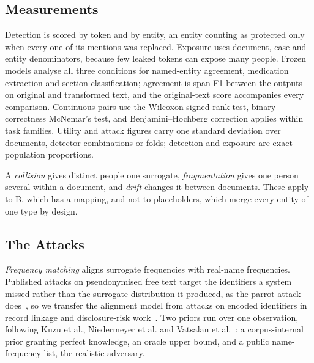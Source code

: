 \subsection{Measurements}\label{sec:measurements}

Detection is scored by token and by entity, an entity counting as protected only when every one of
its mentions was replaced. Exposure uses document, case and entity denominators, because few leaked
tokens can expose many people. Frozen models analyse all three conditions for named-entity agreement, medication extraction
and section classification; agreement is span F1 between the outputs on original and transformed
text, and the original-text score accompanies every comparison. Continuous pairs use the Wilcoxon
signed-rank test, binary correctness McNemar's test, and Benjamini--Hochberg correction applies
within task families. Utility and attack figures carry one standard deviation over documents,
detector combinations or folds; detection and exposure are exact population proportions.

A \emph{collision} gives distinct people one surrogate, \emph{fragmentation} gives one person
several within a document, and \emph{drift} changes it between documents. These apply to B, which
has a mapping, and not to placeholders, which merge every entity of one type by design.

\subsection{The Attacks}\label{sec:attacks}

\emph{Frequency matching} aligns surrogate frequencies with real-name frequencies. Published attacks
on pseudonymised free text target the identifiers a system missed rather than the surrogate
distribution it produced, as the parrot attack does~\cite{carrell2019parrot}, so we transfer the
alignment model from attacks on encoded identifiers in record linkage and disclosure-risk
work~\cite{vidanage2022survey,naveed2015inference}. Two priors run over one observation, following
Kuzu et al., Niedermeyer et al. and Vatsalan et
al.~\cite{kuzu2013practical,niedermeyer2014cryptanalysis,vatsalan2014taxonomy}: a corpus-internal
prior granting perfect knowledge, an oracle upper bound, and a public name-frequency list, the
realistic adversary.

